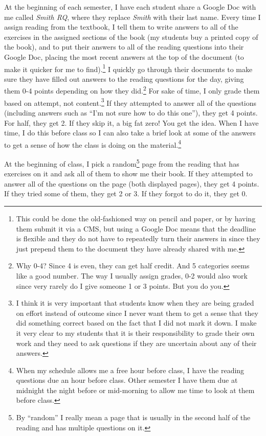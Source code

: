 At the beginning of each semester, I have each student 
share a Google Doc with me called 
{\em Smith RQ}, where they replace {\em Smith} with their last name.
Every time I assign reading from the textbook,
I tell them to write answers to all of the exercises in the assigned sections
of the book (my students buy a printed copy of the book), 
and to put their answers to all of the reading questions into their 
Google Doc, placing the most recent answers at the top of the document
(to make it quicker for me to find).\footnote{
This could be done the old-fashioned way on pencil and paper, 
or by having them submit it via a CMS, but using 
a Google Doc means that the deadline is flexible and
they do not have to repeatedly turn their answers in since they 
just prepend them to the document they have already shared with me.}
I quickly go through their
documents to make sure they have filled out answers to the reading 
questions for the day, 
giving them 0-4 points depending on how they did.\footnote{Why
0-4? Since 4 is even, they can get half credit. And 5 categories seems
like a good number. The way I usually assign grades, 0-2 would also work
since very rarely do I give someone 1 or 3 points. But you do you.
}
For sake
of time, I only grade them based on attempt, not content.\footnote{I
think it is very important that students know when they are being graded
on effort instead of outcome since I never want them to get a sense that
they did something correct based on the fact that I did not mark it down.
I make it very clear to my students that it is their responsibility to grade
their own work and they need to ask questions if they are uncertain
about any of their answers.
} 
If they attempted to answer all of the questions 
(including answers such as ``I'm not sure how to do this one''),
they get 4 points. For half, they get 2. If they skip it, a big fat zero!
You get the idea.
When I have time, I do this before class so I can also take a brief look at 
some of the answers to get a sense of how the class is doing on the 
material.\footnote{
When my schedule allows me a free hour before class, I have the reading
questions due an hour before class. Other semester I have them due at 
midnight the night before or mid-morning to allow me time to look at 
them before class.}


At the beginning of class, I pick a random\footnote{
By ``random'' I really mean a page that is usually
in the second half of the reading and has multiple questions on it.
}
page from the reading 
that has exercises on it and ask all of them to show me their book. 
If they attempted to answer
all of the questions on the page (both displayed pages), they get 4 points.
If they tried some of them, they get 2 or 3. If they forgot to do it, they get 0.

